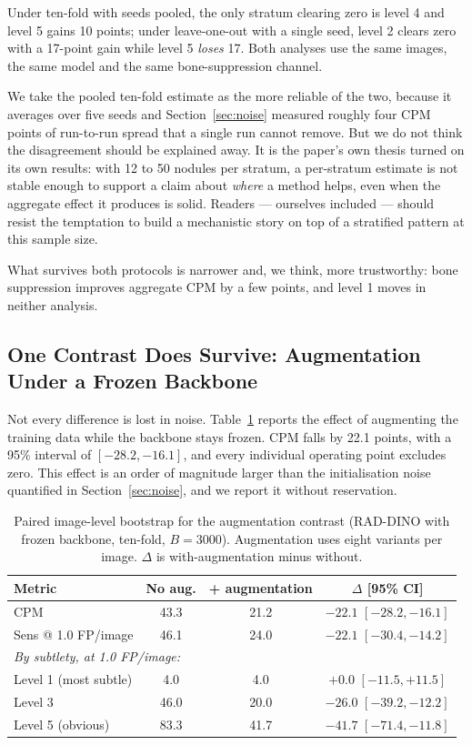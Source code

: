 \documentclass[11pt,a4paper]{article}
\begin{document}
Under ten-fold with seeds pooled, the only stratum clearing zero is level 4 and
level 5 gains 10 points; under leave-one-out with a single seed, level 2 clears
zero with a 17-point gain while level 5 \emph{loses} 17. Both analyses use the
same images, the same model and the same bone-suppression channel.

We take the pooled ten-fold estimate as the more reliable of the two, because it
averages over five seeds and Section~\ref{sec:noise} measured roughly four CPM
points of run-to-run spread that a single run cannot remove. But we do not think
the disagreement should be explained away. It is the paper's own thesis turned on
its own results: with 12 to 50 nodules per stratum, a per-stratum estimate is not
stable enough to support a claim about \emph{where} a method helps, even when the
aggregate effect it produces is solid. Readers --- ourselves included --- should
resist the temptation to build a mechanistic story on top of a stratified
pattern at this sample size.

What survives both protocols is narrower and, we think, more trustworthy: bone
suppression improves aggregate CPM by a few points, and level 1 moves in neither
analysis.

\subsection{One Contrast Does Survive: Augmentation Under a Frozen Backbone}
\label{sec:aug}

Not every difference is lost in noise. Table~\ref{tab:aug} reports the effect of
augmenting the training data while the backbone stays frozen. CPM falls by 22.1
points, with a 95\% interval of $[-28.2, -16.1]$, and every individual operating
point excludes zero. This effect is an order of magnitude larger than the
initialisation noise quantified in Section~\ref{sec:noise}, and we report it
without reservation.

\begin{table}[t]
\centering
\caption{Paired image-level bootstrap for the augmentation contrast (RAD-DINO
with frozen backbone, ten-fold, $B = 3000$). Augmentation uses eight variants
per image. $\Delta$ is with-augmentation minus without.}
\label{tab:aug}
\begin{tabular}{lccc}
\toprule
Metric & No aug. & + augmentation & $\Delta$ [95\% CI] \\
\midrule
CPM                     & 43.3 & 21.2 & $-22.1$ $[-28.2, -16.1]$ \\
Sens @ 1.0 FP/image     & 46.1 & 24.0 & $-22.1$ $[-30.4, -14.2]$ \\
\midrule
\multicolumn{4}{l}{\emph{By subtlety, at 1.0 FP/image:}} \\
Level 1 (most subtle)   &  4.0 &  4.0 & $+0.0$ $[-11.5, +11.5]$ \\
Level 3                 & 46.0 & 20.0 & $-26.0$ $[-39.2, -12.2]$ \\
Level 5 (obvious)       & 83.3 & 41.7 & $-41.7$ $[-71.4, -11.8]$ \\
\bottomrule
\end{tabular}
\end{table}
\end{document}
